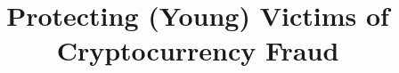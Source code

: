 \documentclass{epsrc}
\newcommand{\1}{1}
\newcommand{\2}{2}
\newcommand{\3}{3}
\newcommand{\4}{4}
\begin{document}
%
\newcommand{\printcntr}{%
  \stepcounter{mycounter}%
  \padzeroes[1]{\decimal{mycounter}}%
}

%
\title{Protecting (Young) Victims of Cryptocurrency Fraud}
\author{}
\date{}
\maketitle  
\vspace{-21mm}








%















%
%

\end{document}

